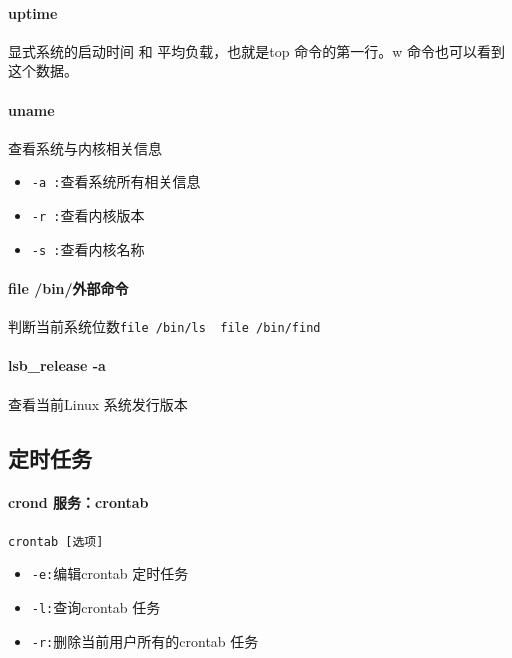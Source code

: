 \documentclass[UTF8,a4paper,12pt]{ctexbook}
\begin{document}
			\paragraph{uptime} 显式系统的启动时间 和 平均负载，也就是top 命令的第一行。w 命令也可以看到这个数据。
			
			\paragraph{uname} 查看系统与内核相关信息
				\begin{itemize}
					\item \verb|-a :|查看系统所有相关信息
					\item \verb|-r :|查看内核版本
					\item \verb|-s :|查看内核名称
				\end{itemize}
				
			\paragraph{file /bin/外部命令} 判断当前系统位数\verb|file /bin/ls  file /bin/find|
			
			\paragraph{lsb\_release -a}查看当前Linux 系统发行版本
		
		\subsection{定时任务}
			\paragraph{crond 服务：crontab}\verb|crontab [选项]|
				\begin{itemize}
					\item \verb|-e:|编辑crontab 定时任务
					\item \verb|-l:|查询crontab 任务
					\item \verb|-r:|删除当前用户所有的crontab 任务
				\end{itemize}
			
\end{document}
